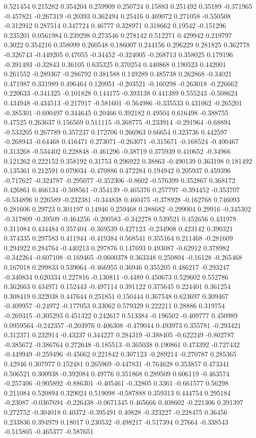 0.521454 0.215282 0.354204 0.259909 0.250724 0.15883 0.251492 0.35189 -0.371965 -0.457821 -0.267319 -0.20393 0.362494 0.25416 0.469072 0.271058 -0.550508 -0.312912 0.287514 0.347724 0.46777 0.328971 0.318662 0.19542 -0.151296 0.235201 0.0561984 0.239298 0.273546 0.278142 0.512271 0.429942 0.219797 0.3022 0.354216 0.358099 0.260548 0.186007 0.244156 0.296229 0.281825 0.362778 -0.326743 -0.449205 0.47055 -0.34452 -0.324005 -0.268713 0.358025 0.179196 -0.391493 -0.32843 0.36105 0.635325 0.370254 0.440868 0.190523 0.442001 0.261552 -0.289367 -0.286792 0.381588 0.149289 0.485738 0.262868 -0.34021 0.471987 0.331989 0.496464 0.120951 -0.203521 -0.160298 -0.263018 -0.226662 0.220633 -0.341325 -0.101828 0.144175 -0.393138 0.441389 0.555243 -0.508624 0.434948 -0.434513 -0.217917 -0.581601 -0.564986 -0.335533 0.431062 -0.265201 -0.385301 -0.600497 0.344645 0.20466 0.392182 0.49504 0.616498 -0.388755 0.47525 0.263637 0.156569 0.511115 -0.368775 -0.233914 -0.291964 -0.68894 -0.533205 0.267789 0.357237 0.172706 0.266963 0.66654 0.323736 0.442597 -0.268943 -0.64468 0.416471 0.273071 -0.263071 -0.315671 -0.168524 -0.400467 0.313268 -0.534402 0.228848 -0.461296 -0.38719 0.375939 0.410652 -0.34966 0.121262 0.222152 0.358192 0.31753 0.296922 0.38863 -0.490139 0.363198 0.181492 0.135361 0.212591 0.079034 -0.470886 0.472284 0.194942 0.205937 0.459396 -0.717627 -0.324787 -0.295077 -0.352306 -0.8602 -0.576399 0.352867 0.368172 0.426861 0.466134 -0.508561 -0.354139 -0.465376 0.257797 -0.394452 -0.353707 -0.534896 0.226589 -0.232381 -0.344838 0.460475 -0.378928 -0.162768 0.746093 0.281606 0.29723 0.301197 0.14946 0.259468 0.388682 -0.299004 0.29916 -0.345302 -0.317809 -0.39509 -0.464256 -0.200583 -0.342278 0.539521 0.452656 0.431978 0.311084 0.434484 0.357404 -0.369539 0.427123 -0.234908 0.423142 0.390321 0.374335 0.297583 0.411944 -0.419384 0.568541 0.355164 0.211468 -0.281609 0.294922 0.284764 -0.440213 0.297876 0.147693 0.493087 -0.62912 0.378982 -0.342264 -0.607108 -0.169465 -0.0600378 0.363348 0.250804 -0.16128 -0.265468 0.167018 0.299833 0.539064 -0.466955 0.36946 0.355205 0.486217 -0.293247 -0.340834 0.620334 0.227816 -0.130811 -0.4489 0.450673 0.529602 0.552786 0.362663 0.434971 0.152443 -0.497114 0.391122 0.375645 0.224401 0.361254 0.308419 0.322038 0.447644 0.251851 0.150444 0.367548 0.623697 0.309467 -0.409957 -0.24972 -0.177053 0.33062 0.579329 0.222211 0.28886 0.319754 -0.269315 -0.305293 0.451322 0.242617 0.513384 -0.196502 -0.409777 0.450989 0.0959564 -0.242357 -0.203976 0.406308 -0.479044 0.493973 0.355781 -0.293421 0.312371 0.232914 -0.43237 0.344227 0.284319 -0.388405 -0.622249 -0.802787 -0.385672 -0.386764 0.272648 -0.185513 -0.365038 0.190861 0.473392 -0.727432 -0.449949 -0.259496 -0.45662 0.221842 0.307123 -0.289214 -0.270787 0.285365 0.42946 0.307977 0.152481 0.265969 -0.447831 -0.764628 0.353857 0.473341 0.506521 0.300938 -0.392084 0.49776 0.351868 0.289509 0.606119 -0.463574 -0.257406 -0.905892 -0.886301 -0.405461 -0.32805 0.3361 -0.661577 0.56298 0.211084 0.520894 0.329024 0.519098 -0.587888 0.359313 0.444754 0.295184 -0.23087 -0.0367694 -0.226438 -0.0671345 0.465666 0.408602 -0.221306 0.391397 0.272752 -0.304018 0.40372 -0.395491 0.40828 -0.323227 -0.228475 0.36456 0.233836 0.394979 0.18017 0.230532 -0.498217 -0.517394 0.27664 -0.338543 -0.515805 -0.465377 -0.587651 